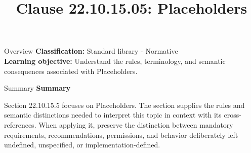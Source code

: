 \documentclass[10pt,letterpaper]{article}
\title{Clause 22.10.15.05: Placeholders}
\author{}
\date{}
\begin{document}
\maketitle
\begin{CornellOverviewBox}{Overview}
\textbf{Classification:} Standard library - Normative\\[2pt]
\textbf{Learning objective:} Understand the rules, terminology, and semantic consequences associated with Placeholders.
\end{CornellOverviewBox}\begin{CornellSummaryBox}{Summary}
{\sffamily\bfseries\color{Accent} Summary}\par\vspace{3pt}Section 22.10.15.5 focuses on Placeholders. The section supplies the rules and semantic distinctions needed to interpret this topic in context with its cross-references. When applying it, preserve the distinction between mandatory requirements, recommendations, permissions, and behavior deliberately left undefined, unspecified, or implementation-defined.
\end{CornellSummaryBox}
\end{document}
